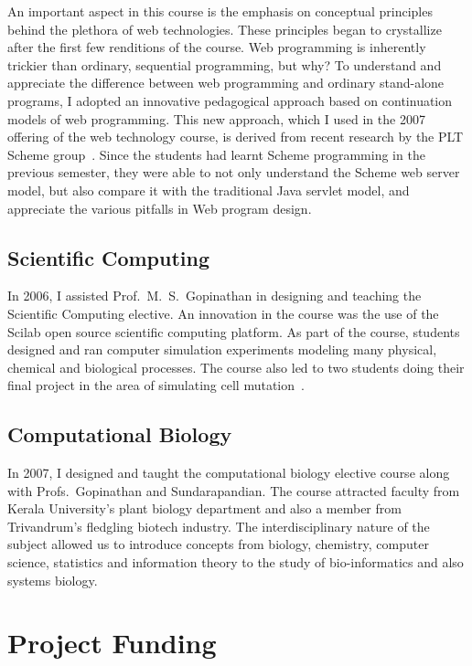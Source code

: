\documentclass[titlepage, %
11pt, 
]{article}
\begin{document}
An important aspect in this course is the emphasis on
conceptual principles behind the plethora of web
technologies.  These principles began to crystallize after
the first few renditions of the course.  Web programming is
inherently trickier than ordinary, sequential programming,
but why?  To understand and appreciate the difference
between web programming and ordinary stand-alone programs, I
adopted an innovative pedagogical approach based on
continuation models of web programming.  This new approach,
which I used in the 2007 offering of the web technology
course, is derived from recent research by the PLT Scheme
group~\cite{Krishnamurthi-et-al-plt-web-server-hosc-2007}.
Since the students had learnt Scheme programming in the
previous semester, they were able to not only understand the
Scheme web server model, but also compare it with the
traditional Java servlet model, and appreciate the various
pitfalls in Web program design.

\subsection{Scientific Computing}
\label{subsec:scicomp}

In 2006, I assisted Prof.~M.~S.~Gopinathan in designing and
teaching the Scientific Computing elective.  An innovation
in the course was the use of the Scilab open source
scientific computing platform.  As part of the course,
students designed and ran computer simulation experiments
modeling many physical, chemical and biological processes.
The course also led to two students doing their final
project in the area of simulating cell
mutation~\cite{sam-soman-2007}.

\subsection{Computational Biology}
\label{subsec:computational-biology}

In 2007, I designed and taught the computational biology
elective course along with Profs.~Gopinathan and
Sundarapandian.  The course attracted faculty from Kerala
University's plant biology department and also a member from
Trivandrum's fledgling biotech industry.  The
interdisciplinary nature of the subject allowed us to
introduce concepts from biology, chemistry, computer
science, statistics and information theory to the study of
bio-informatics and also systems biology.  

\section{Project Funding}
\label{sec:projects}
\end{document}
